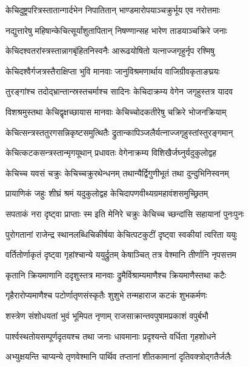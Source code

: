 \twolineshloka
{केचिदुष्ट्रपरित्रस्तातान्गार्दभेन निपातितान्}
{भाण्डमारोपयाञ्चक्रुर्भूय एव नरोत्तमाः}%

\twolineshloka
{नद्युत्तारेषु महिषान्केचित्सूर्यांशुतापितान्}
{निषण्णान्सह भारेण ताडयाञ्चक्रिरे जनाः}%

\twolineshloka
{केचिदश्वतरांस्त्रस्तान्नागबृंहितनिस्वनैः}
{आरूढयोषितो यत्नाज्जगृहुर्नृप रश्मिषु}%

\twolineshloka
{केचिदश्वैर्गजत्रस्तैराक्षिप्ता भुवि मानवाः}
{जानुविश्रमणार्थाय वाजिग्रीवकृताङघ्रयः}%

\twolineshloka
{तुरङ्गांश्च तदोद्भ्रान्तान्स्रस्तचर्माश्च सादिनः}
{केचिदाक्रम्य वेगेन जगृहुस्तत्र यादव}%

\twolineshloka
{विशश्रमुस्तथा केचिद्वृक्षच्छायास मानवाः}
{केचिच्चोदकतीरेषु चक्रिरे भोजनक्रियाम्} %

\twolineshloka
{केचित्सन्त्रस्ततुरगसन्निकृष्टसमुत्थितैः}
{द्रुतान्कापिञ्जलैर्यत्नाज्जगृहुस्तांस्तुरङ्गमान्}%
 
\twolineshloka
{केचित्कटकसन्त्रस्तान्मृगयूथान् प्रधावतः}
{वेगेनाक्रम्य विशिखैर्जघ्नुर्यदुकुलोद्वह}%

\twolineshloka
{केचिच्च यवसं चक्रुः केचिच्चक्रुरथेन्धनम्}
{तथान्यैर्द्विगुणीभूतं तथा दुन्दुभिनिस्वनम्}%

\twolineshloka
{प्रायाणिकं जहुः शीघ्रं श्रमं यदुकुलोद्वह}
{केचिदापणवीथ्यग्रमहावंशसमुच्छ्रितम्}%

\twolineshloka
{सपताकं नरा दृष्ट्वा प्राप्ताः स्म इति मेनिरे}
{चक्रुः केचिच्च च्छन्दांसि सहायानां पुनःपुनः}%

\twolineshloka
{पुरोगतानां राजेन्द्र स्थानलब्धिचिकीर्षया}
{केचित्पटकुटीं दृष्ट्वा स्वकीयां त्वरिता ययुः}%

\twolineshloka
{वर्तितोर्णाकृतं दृष्ट्वा गृहांश्चान्ये ययुर्द्रुतम्}
{केषाञ्चित् तत्र वेश्मानि तीर्णानि नृपसत्तम}%

\twolineshloka
{कृतानि क्रियमाणानि ददृशुस्तत्र मानवाः}
{द्रुमैर्विश्राम्यमाणैश्च क्रियमाणैस्तथा कटैः}%

\twolineshloka
{गृहैरारोप्यमाणैश्च पटोर्णातृणसंस्कृतैः}
{शुशुभे तन्महाराज कटकं शुभकर्मणः}%

\twolineshloka
{शस्त्रेण संशोधयतां भुवं भूमिपत नृणाम्}
{राजसाक्रान्तवपुषामप्रकाशं वपुर्बभौ} %

\twolineshloka
{पार्श्वस्थतोयसम्पूर्णदृतयश्च तथा जनाः}
{धावमानाः प्रदृश्यन्ते वर्धिता गृहशोधने}%

\twolineshloka
{अभ्युक्षयन्ति चाप्यन्ये तृणवेश्मानि पार्थिव}
{तप्तानां शीतकामानां दृतिवक्त्रोद्गतैर्जलैः}%

